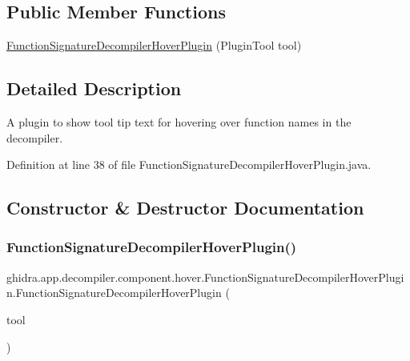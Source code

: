 \subsection*{Public Member Functions}
\begin{DoxyCompactItemize}
\item 
\mbox{\hyperlink{classghidra_1_1app_1_1decompiler_1_1component_1_1hover_1_1_function_signature_decompiler_hover_plugin_a45a381062075d2a3a87e599844144665}{Function\+Signature\+Decompiler\+Hover\+Plugin}} (Plugin\+Tool tool)
\end{DoxyCompactItemize}


\subsection{Detailed Description}
A plugin to show tool tip text for hovering over function names in the decompiler. 

Definition at line 38 of file Function\+Signature\+Decompiler\+Hover\+Plugin.\+java.



\subsection{Constructor \& Destructor Documentation}
\mbox{\label{classghidra_1_1app_1_1decompiler_1_1component_1_1hover_1_1_function_signature_decompiler_hover_plugin_a45a381062075d2a3a87e599844144665}} 
\subsubsection{\texorpdfstring{FunctionSignatureDecompilerHoverPlugin()}{FunctionSignatureDecompilerHoverPlugin()}}
{\footnotesize\ttfamily ghidra.\+app.\+decompiler.\+component.\+hover.\+Function\+Signature\+Decompiler\+Hover\+Plugin.\+Function\+Signature\+Decompiler\+Hover\+Plugin (\begin{DoxyParamCaption}\item[{Plugin\+Tool}]{tool }\end{DoxyParamCaption})\hspace{0.3cm}{\ttfamily [inline]}}



